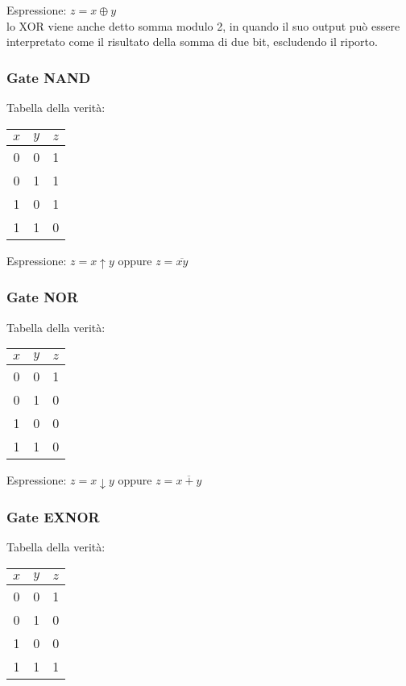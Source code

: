 \documentclass{article}
\begin{document}
\noindent
Espressione: $z = x \oplus y$ \\

\noindent
lo XOR viene anche detto somma modulo 2, in quando il suo output può essere interpretato come il risultato della somma di due bit, escludendo il riporto.

\subsubsection{Gate NAND}

Tabella della verità:

\begin{center}
\begin{tabular}{ |c|c|c| }
\hline
$x$ & $y$ & $z$ \\
\hline
\hline
0 & 0 & 1 \\
0 & 1 & 1 \\
1 & 0 & 1 \\
1 & 1 & 0 \\
\hline
\end{tabular}
\end{center}

\noindent
Espressione: $z = x \uparrow y$ oppure $z = \overline{xy}$

\subsubsection{Gate NOR}

Tabella della verità:

\begin{center}
\begin{tabular}{ |c|c|c| }
\hline
$x$ & $y$ & $z$ \\
\hline
\hline
0 & 0 & 1 \\
0 & 1 & 0 \\
1 & 0 & 0 \\
1 & 1 & 0 \\
\hline
\end{tabular}
\end{center}

\noindent
Espressione: $z = x \downarrow y$ oppure $z = \overline{x+y}$

\subsubsection{Gate EXNOR}

Tabella della verità:

\begin{center}
\begin{tabular}{ |c|c|c| }
\hline
$x$ & $y$ & $z$ \\
\hline
\hline
0 & 0 & 1 \\
0 & 1 & 0 \\
1 & 0 & 0 \\
1 & 1 & 1 \\
\hline
\end{tabular}
\end{center}
\end{document}
